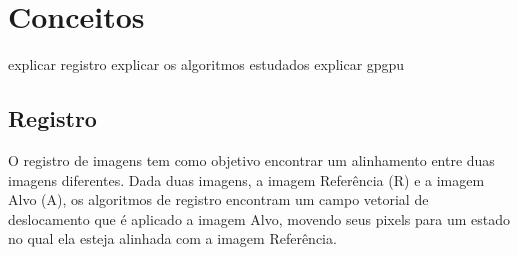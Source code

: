 \chapter{Conceitos}
\label{cap:conceitos}

explicar registro
explicar os algoritmos estudados
explicar gpgpu

\section{Registro}
\label{sec:fundamentos}

    O registro de imagens tem como objetivo encontrar um alinhamento entre duas imagens diferentes. Dada duas imagens, 
a imagem Referência (R) e a imagem Alvo (A), os algoritmos de registro encontram um campo
vetorial de deslocamento que é aplicado a imagem Alvo, movendo seus pixels para um estado no qual ela esteja alinhada
com a imagem Referência.



